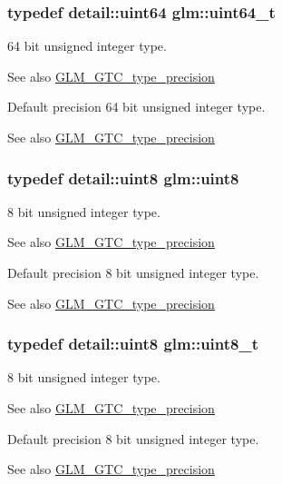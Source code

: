 \subsubsection[{\texorpdfstring{uint64\+\_\+t}{uint64_t}}]{\setlength{\rightskip}{0pt plus 5cm}typedef detail\+::uint64 {\bf glm\+::uint64\+\_\+t}}\hypertarget{group__gtc__type__precision_ga058f57c19e1befdcf12498944bd73e69}{}\label{group__gtc__type__precision_ga058f57c19e1befdcf12498944bd73e69}
64 bit unsigned integer type. \begin{DoxySeeAlso}{See also}
\hyperlink{group__gtc__type__precision}{G\+L\+M\+\_\+\+G\+T\+C\+\_\+type\+\_\+precision}
\end{DoxySeeAlso}
Default precision 64 bit unsigned integer type. \begin{DoxySeeAlso}{See also}
\hyperlink{group__gtc__type__precision}{G\+L\+M\+\_\+\+G\+T\+C\+\_\+type\+\_\+precision} 
\end{DoxySeeAlso}
\subsubsection[{\texorpdfstring{uint8}{uint8}}]{\setlength{\rightskip}{0pt plus 5cm}typedef detail\+::uint8 {\bf glm\+::uint8}}\hypertarget{group__gtc__type__precision_ga1a7dcd8aac97cc8020817c94049deff2}{}\label{group__gtc__type__precision_ga1a7dcd8aac97cc8020817c94049deff2}
8 bit unsigned integer type. \begin{DoxySeeAlso}{See also}
\hyperlink{group__gtc__type__precision}{G\+L\+M\+\_\+\+G\+T\+C\+\_\+type\+\_\+precision}
\end{DoxySeeAlso}
Default precision 8 bit unsigned integer type. \begin{DoxySeeAlso}{See also}
\hyperlink{group__gtc__type__precision}{G\+L\+M\+\_\+\+G\+T\+C\+\_\+type\+\_\+precision} 
\end{DoxySeeAlso}
\subsubsection[{\texorpdfstring{uint8\+\_\+t}{uint8_t}}]{\setlength{\rightskip}{0pt plus 5cm}typedef detail\+::uint8 {\bf glm\+::uint8\+\_\+t}}\hypertarget{group__gtc__type__precision_ga93adf6dd9803408f3e3aaf9dedda352b}{}\label{group__gtc__type__precision_ga93adf6dd9803408f3e3aaf9dedda352b}
8 bit unsigned integer type. \begin{DoxySeeAlso}{See also}
\hyperlink{group__gtc__type__precision}{G\+L\+M\+\_\+\+G\+T\+C\+\_\+type\+\_\+precision}
\end{DoxySeeAlso}
Default precision 8 bit unsigned integer type. \begin{DoxySeeAlso}{See also}
\hyperlink{group__gtc__type__precision}{G\+L\+M\+\_\+\+G\+T\+C\+\_\+type\+\_\+precision} 
\end{DoxySeeAlso}
